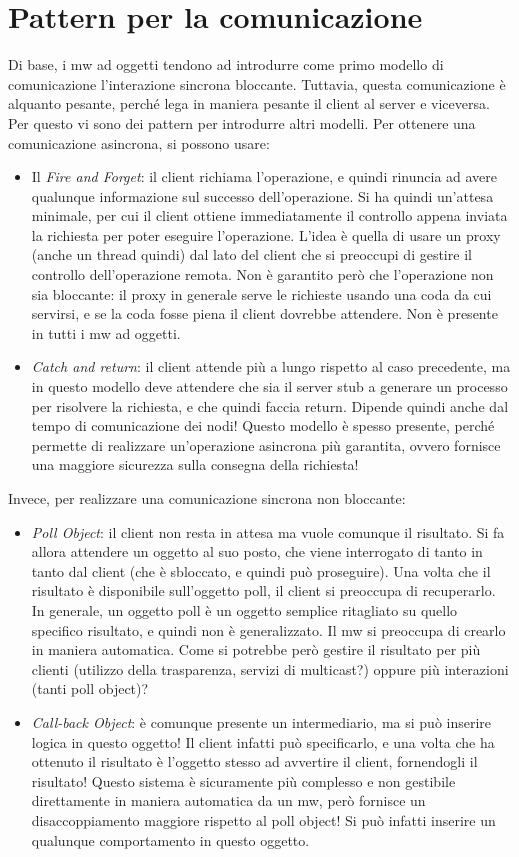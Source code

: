 \section{Pattern per la comunicazione}
Di base, i mw ad oggetti tendono ad introdurre come primo modello di comunicazione l'interazione sincrona bloccante.
Tuttavia, questa comunicazione è alquanto pesante, perché lega in maniera pesante il client al server e viceversa.
Per questo vi sono dei pattern per introdurre altri modelli.
Per ottenere una comunicazione asincrona, si possono usare:
\begin{itemize}
 \item Il \textit{Fire and Forget}: il client richiama l'operazione, e quindi rinuncia ad avere qualunque informazione
 sul successo dell'operazione. Si ha quindi un'attesa minimale, per cui il client ottiene immediatamente il controllo
 appena inviata la richiesta per poter eseguire l'operazione. L'idea è quella di usare un proxy (anche un thread quindi)
 dal lato del client che si preoccupi di gestire il controllo dell'operazione remota. Non è garantito però che
 l'operazione non sia bloccante: il proxy in generale serve le richieste usando una coda da cui servirsi, e se la coda
 fosse piena il client dovrebbe attendere. Non è presente in tutti i mw ad oggetti.
 \item \textit{Catch and return}: il client attende più a lungo rispetto al caso precedente, ma in questo modello deve
 attendere che sia il server stub a generare un processo per risolvere la richiesta, e che quindi faccia return. Dipende
 quindi anche dal tempo di comunicazione dei nodi! Questo modello è spesso presente, perché permette di realizzare
 un'operazione asincrona più garantita, ovvero fornisce una maggiore sicurezza sulla consegna della richiesta!
\end{itemize}
Invece, per realizzare una comunicazione sincrona non bloccante:
\begin{itemize}
 \item \textit{Poll Object}: il client non resta in attesa ma vuole comunque il risultato.
 Si fa allora attendere un oggetto al suo posto, che viene interrogato di tanto in tanto dal client (che è sbloccato,
 e quindi può proseguire). Una volta che il risultato è disponibile sull'oggetto poll, il client si preoccupa di
 recuperarlo.
 In generale, un oggetto poll è un oggetto semplice ritagliato su quello specifico risultato, e quindi non è
 generalizzato. Il mw si preoccupa di crearlo in maniera automatica. Come si potrebbe però gestire il risultato per
 più clienti (utilizzo della trasparenza, servizi di multicast?) oppure più interazioni (tanti poll object)?
 \item \textit{Call-back Object}: è comunque presente un intermediario, ma si può inserire logica in questo oggetto!
 Il client infatti può specificarlo, e una volta che ha ottenuto il risultato è l'oggetto stesso ad avvertire il
 client, fornendogli il risultato! Questo sistema è sicuramente più complesso e non gestibile direttamente in maniera
 automatica da un mw, però fornisce un disaccoppiamento maggiore rispetto al poll object! Si può infatti inserire
 un qualunque comportamento in questo oggetto.
\end{itemize}
